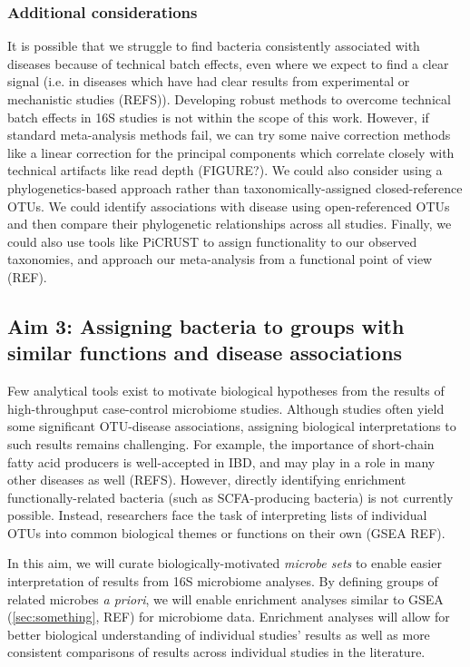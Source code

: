 \documentclass[12pt]{article}
\begin{document}
\subsubsection{Additional considerations}
It is possible that we struggle to find bacteria consistently associated with diseases because of technical batch effects, even where we expect to find a clear signal (i.e. in diseases which have had clear results from experimental or mechanistic studies (REFS)). Developing robust methods to overcome technical batch effects in 16S studies is not within the scope of this work. However, if standard meta-analysis methods fail, we can try some naive correction methods like a linear correction for the principal components which correlate closely with technical artifacts like read depth (FIGURE?). We could also consider using a phylogenetics-based approach rather than taxonomically-assigned closed-reference OTUs. We could identify associations with disease using open-referenced OTUs and then compare their phylogenetic relationships across all studies. Finally, we could also use tools like PiCRUST to assign functionality to our observed taxonomies, and approach our meta-analysis from a functional point of view (REF). 

\subsection{Aim 3: Assigning bacteria to groups with similar functions and disease associations}
Few analytical tools exist to motivate biological hypotheses from the results of high-throughput case-control microbiome studies. Although studies often yield some significant OTU-disease associations, assigning biological interpretations to such results remains challenging. For example, the importance of short-chain fatty acid producers is well-accepted in IBD, and may play in a role in many other diseases as well (REFS). However, directly identifying enrichment functionally-related bacteria (such as SCFA-producing bacteria) is not currently possible. Instead, researchers face the task of interpreting lists of individual OTUs into common biological themes or functions on their own (GSEA REF). 

In this aim, we will curate biologically-motivated \textit{microbe sets} to enable easier interpretation of results from 16S microbiome analyses. By defining groups of related microbes \textit{a priori}, we will enable enrichment analyses similar to GSEA (\ref{sec:something}, REF) for microbiome data. Enrichment analyses will allow for better biological understanding of individual studies' results as well as more consistent comparisons of results across individual studies in the literature.
\end{document}
